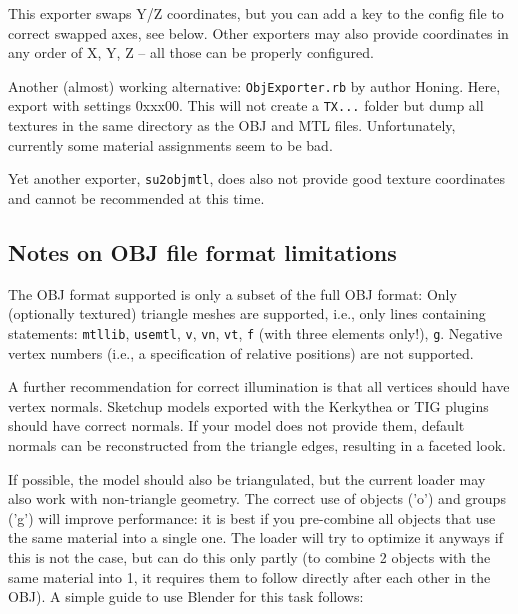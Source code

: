 \documentclass[a4paper]{article}
\newcommand{\filename}[1]{\texttt{#1}}
\newcommand{\cmd}[1]{\texttt{#1}}
\begin{document}

This exporter swaps Y/Z coordinates, but you can add a key to the config file to
correct swapped axes, see below. Other exporters may also provide coordinates in
any order of X, Y, Z -- all those can be properly configured.

Another (almost) working alternative: \filename{ObjExporter.rb} by author
Honing.  Here, export with settings 0xxx00. This will not create a
\filename{TX...} folder but dump all textures in the same directory as the OBJ
and MTL files. Unfortunately, currently some material assignments seem to be
bad.

Yet another exporter, \filename{su2objmtl}, does also not provide good texture
coordinates and cannot be recommended at this time.

\subsection{Notes on OBJ file format limitations}
\label{sec:OBJlimitations}

The OBJ format supported is only a subset of the full OBJ format: Only
(optionally textured) triangle meshes are supported, i.e., only lines containing
statements: \cmd{mtllib}, \cmd{usemtl}, \cmd{v}, \cmd{vn}, \cmd{vt}, \cmd{f}
(with three elements only!), \cmd{g}. Negative vertex numbers (i.e., a
specification of relative positions) are not supported.

A further recommendation for correct illumination is that all vertices should
have vertex normals. Sketchup models exported with the Kerkythea or TIG plugins
should have correct normals. If your model does not provide them, default
normals can be reconstructed from the triangle edges, resulting in a faceted
look.

If possible, the model should also be triangulated, but the current loader may
also work with non-triangle geometry. 
The correct use of objects ('o') and
groups ('g') will improve performance: it is best if you pre-combine all objects
that use the same material into a single one. The loader will try to optimize it
anyways if this is not the case, but can do this only partly (to combine 2
objects with the same material into 1, it requires them to follow directly after
each other in the OBJ). A simple guide to use Blender for this task follows:
\end{document}
